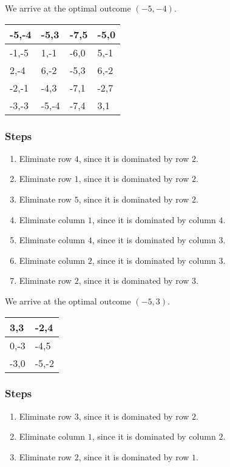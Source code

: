 \documentclass{article}
\begin{document}
We arrive at the optimal outcome $(-5, -4)$.
\newpage
\begin{table}[]
\centering
\begin{tabular}{|l|l|l|l|}
\hline-5,-4 & -5,3 & -7,5 & -5,0\\ \hline
-1,-5 & 1,-1 & -6,0 & 5,-1\\ \hline
2,-4 & 6,-2 & -5,3 & 6,-2\\ \hline
-2,-1 & -4,3 & -7,1 & -2,7\\ \hline
-3,-3 & -5,-4 & -7,4 & 3,1\\ \hline
\end{tabular}
\end{table}\subsubsection*{Steps}
\begin{enumerate}
\item Eliminate row $4$, since it is dominated by row $2$.
\item Eliminate row $1$, since it is dominated by row $2$.
\item Eliminate row $5$, since it is dominated by row $2$.
\item Eliminate column $1$, since it is dominated by column $4$.
\item Eliminate column $4$, since it is dominated by column $3$.
\item Eliminate column $2$, since it is dominated by column $3$.
\item Eliminate row $2$, since it is dominated by row $3$.
\end{enumerate}
We arrive at the optimal outcome $(-5, 3)$.
\newpage
\begin{table}[]
\centering
\begin{tabular}{|l|l|}
\hline3,3 & -2,4\\ \hline
0,-3 & -4,5\\ \hline
-3,0 & -5,-2\\ \hline
\end{tabular}
\end{table}\subsubsection*{Steps}
\begin{enumerate}
\item Eliminate row $3$, since it is dominated by row $2$.
\item Eliminate column $1$, since it is dominated by column $2$.
\item Eliminate row $2$, since it is dominated by row $1$.
\end{enumerate}
\end{document}
